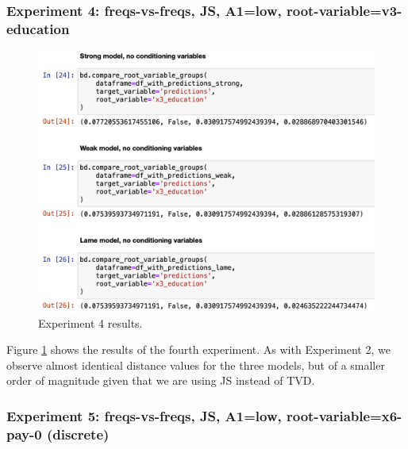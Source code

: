 \documentclass[
]{ceurart}
\begin{document}
\subsubsection{Experiment 4: freqs-vs-freqs, JS, A1=low, root-variable=v3-education}

\begin{figure}[h!]
  \includegraphics[width=.7\linewidth, left]{exp4.png}
  \caption{Experiment 4 results.}
  \label{fig:exp4}
\end{figure}
Figure \ref{fig:exp4} shows the results of the fourth experiment. As with Experiment 2, we observe almost identical distance values for the three models, but of a smaller order of magnitude given that we are using JS instead of TVD. 

\subsubsection{Experiment 5: freqs-vs-freqs, JS, A1=low, root-variable=x6-pay-0 (discrete)}
\end{document}
